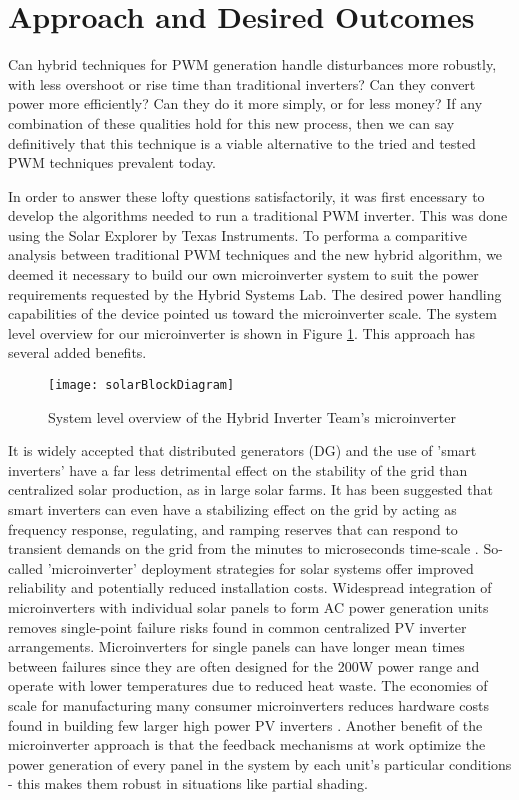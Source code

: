 \section{Approach and Desired Outcomes}
Can hybrid techniques for PWM generation handle disturbances more robustly, with less overshoot or rise time than traditional inverters? Can they convert power more efficiently? Can they do it more simply, or for less money? If any combination of these qualities hold for this new process, then we can say definitively that this technique is a viable alternative to the tried and tested PWM techniques prevalent today.

In order to answer these lofty questions satisfactorily, it was first encessary to develop the algorithms needed to run a traditional PWM inverter. This was done using the Solar Explorer by Texas Instruments. To performa a comparitive analysis between traditional PWM techniques and the new hybrid algorithm, we deemed it necessary to build our own microinverter system to suit the power requirements requested by the Hybrid Systems Lab. The desired power handling capabilities of the device pointed us toward the microinverter scale. The system level overview for our microinverter is shown in Figure \ref{solarBlock}. This approach has several added benefits.

\begin{figure}[h]
\centering
\texttt{[image: solarBlockDiagram]}
\caption{System level overview of the Hybrid Inverter Team's microinverter}
\label{solarBlock}
\end{figure}

It is widely accepted that distributed generators (DG) and the use of 'smart inverters' have a far less detrimental effect on the stability of the grid than centralized solar production, as in large solar farms. It has been suggested that smart inverters can even have a stabilizing effect on the grid by acting as frequency response, regulating, and ramping reserves that can respond to transient demands on the grid from the minutes to microseconds time-scale \cite{futureGrid}. So-called 'microinverter' deployment strategies for solar systems offer improved reliability and potentially reduced installation costs. Widespread integration of microinverters with individual solar panels to form AC power generation units removes single-point failure risks found in common centralized PV inverter arrangements. Microinverters for single panels can have longer mean times between failures since they are often designed for the 200W power range and operate with lower temperatures due to reduced heat waste. The economies of scale for manufacturing many consumer microinverters reduces hardware costs found in building few larger high power PV inverters \cite{microchip}. Another benefit of the microinverter approach is that the feedback mechanisms at work optimize the power generation of every panel in the system by each unit's particular conditions - this makes them robust in situations like partial shading.

